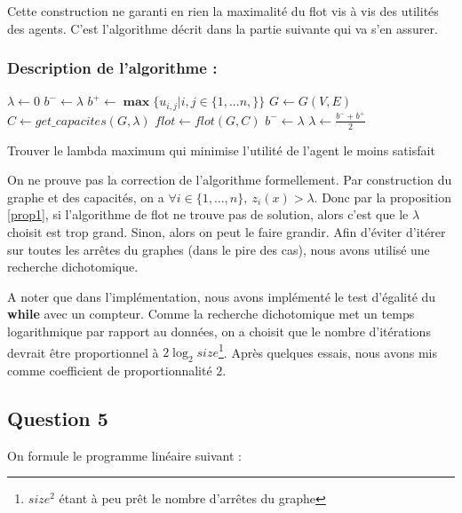 \documentclass[a4paper, titlepage, oneside, 12pt]{article}%
\newcommand\boldmin{\mathop{\mathbf{min}}}
\newcommand\boldmax{\mathop{\mathbf{max}}}
\begin{document}
Cette construction ne garanti en rien la maximalité du flot vis à vis des utilités des agents. C'est l'algorithme décrit dans la partie suivante qui va s'en assurer.

\subsubsection{Description de l'algorithme : }
\begin{algorithm}
\DontPrintSemicolon %
\KwOut{$z^*=\boldmax \boldmin z_i(x)$}
$\lambda \gets 0$\;
$b^- \gets \lambda$\;
$b^+ \gets \boldmax \{u_{i,j} | i,j \in \{1,...n,\}\}$\;
$G \gets G(V,E)$\;
 {
  $C\gets get\_capacites(G,\lambda)$\;
  $flot \gets flot(G,C)$\;
   {
    $b^- \gets \lambda $\;
  }
  $\lambda \gets \frac{b^- + b^+}{2}$\;
}

\Return{$\lambda$}\;
\caption{Trouver le lambda maximum qui minimise l'utilité de l'agent le moins satisfait}
\label{algo:max}
\end{algorithm}
    

On ne prouve pas la correction de l'algorithme formellement. Par construction du graphe et des capacités, on a $\forall i \in \{1,\dots, n\},\ z_i(x)>\lambda$. Donc par la proposition \ref{prop1}, si l'algorithme de flot ne trouve pas de solution, alors c'est que le $\lambda$ choisit est trop grand. Sinon, alors on peut le faire grandir. Afin d'éviter d'itérer sur toutes les arrêtes du graphes (dans le pire des cas), nous avons utilisé une recherche dichotomique.

A noter que dans l'implémentation, nous avons implémenté le test d'égalité du \textbf{while} avec un compteur. Comme la recherche dichotomique met un temps logarithmique par rapport au données, on a choisit que le nombre d'itérations devrait être proportionnel à $2\log_2 size$\footnote{$size^2$ étant à peu prêt le nombre d'arrêtes du graphe}. Après quelques essais, nous avons mis comme coefficient de proportionnalité $2$.

\subsection{Question 5}
On formule le programme linéaire suivant :
\end{document}
